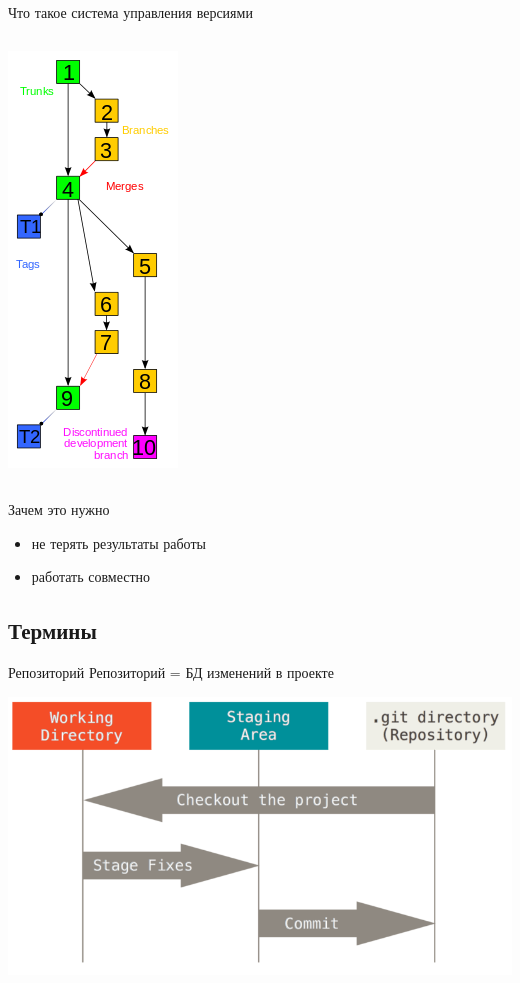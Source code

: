 \documentclass[presentation]{beamer}
\begin{document}
\begin{frame}[label={sec:orgf992b09}]{Что такое система управления версиями}
\begin{columns}
\begin{column}{0.35\columnwidth}
\begin{center}
\includegraphics[height=0.8\textheight]{./00_branches_from_wikipedia.png}
\end{center}
\end{column}
\end{columns}
\end{frame}

\begin{frame}[label={sec:orgd70ce89}]{Зачем это нужно}
\begin{itemize}
\item не терять результаты работы
\item работать совместно
\end{itemize}
\end{frame}

\subsection{Термины}
\label{sec:org0ee7043}
\begin{frame}[label={sec:orge58ae94}]{Репозиторий}
Репозиторий = БД изменений в проекте

\begin{center}
\includegraphics[width=.9\linewidth]{./01_vcs_02_git_directories.png}
\end{center}
\end{frame}
\end{document}
